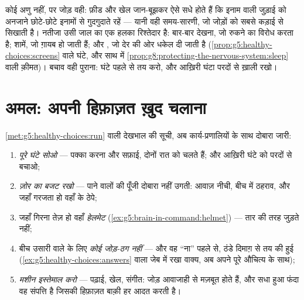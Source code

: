 \begin{example}[परदे का फंदा]\label{ex:g8:protecting-the-nervous-system:screens}
कोई अणु नहीं, पर जोड़ वही: फ़ीड और खेल जान-बूझकर ऐसे सधे होते हैं कि
इनाम वाली जुड़ाई को अनजाने छोटे-छोटे इनामों से गुदगुदाते रहें --- यानी
वही समय-सारणी, जो जोड़ों को सबसे कड़ाई से सिखाती है। नतीजा उसी जाल का एक
हलका रिश्तेदार है: बार-बार देखना, जो रुकने का विरोध करता है; शामें, जो
ग़ायब हो जाती हैं; और , जो देर की ओर धकेल दी जाती है
(\cref{prop:g5:healthy-choices:screens} वाले घंटे, और साथ में
\cref{prop:g8:protecting-the-nervous-system:sleep} वाली क़ीमत)। बचाव
वही पुराना: घंटे पहले से तय करो, और आख़िरी घंटा परदों से ख़ाली रखो।
\end{example}

\section{अमल: अपनी हिफ़ाज़त ख़ुद चलाना}

\begin{method}[तंत्रिका तंत्र के मालिक की पुस्तिका]\label{met:g8:protecting-the-nervous-system:manual}
\cref{met:g5:healthy-choices:run} वाली देखभाल की सूची, अब
कार्य-प्रणालियों के साथ दोबारा जारी:
\begin{enumerate}
  \item \emph{पूरे घंटे सोओ} --- पक्का करना और सफ़ाई, दोनों रात को
        चलते हैं; और आख़िरी घंटे को परदों से बचाओ;
  \item \emph{ज़ोर का बजट रखो} --- पाने वालों की पूँजी दोबारा नहीं
        उगती: आवाज़ नीची, बीच में ठहराव, और जहाँ गरजता हो वहाँ  के
        ठेपे;
  \item जहाँ गिरना तेज़ हो वहाँ \emph{हेलमेट}
        (\cref{ex:g5:brain-in-command:helmet}) --- तार  की तरह
        जुड़ते नहीं;
  \item बीच उसारी वाले  के लिए \emph{कोई जोड़-ठग नहीं} ---
        और वह ``ना'' पहले से, ठंडे दिमाग़ से तय की हुई
        (\cref{ex:g5:healthy-choices:answers} वाला जेब में रखा वाक्य,
        अब अपने पूरे औचित्य के साथ);
  \item \emph{मशीन इस्तेमाल करो} --- पढ़ाई, खेल, संगीत: जोड़ आवाजाही से
        मज़बूत होते हैं, और सधा हुआ फंदा वह संपत्ति है जिसकी हिफ़ाज़त
        बाक़ी हर आदत करती है।
\end{enumerate}
\end{method}

